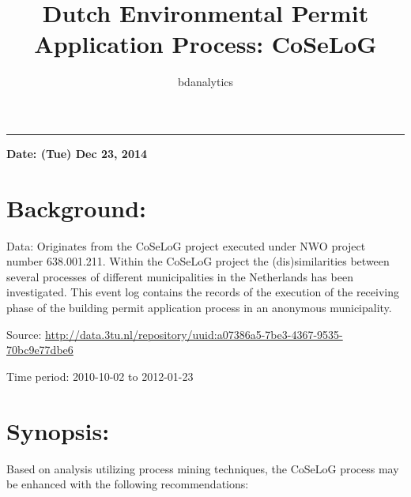 \documentclass[]{article}
\title{Dutch Environmental Permit Application Process: CoSeLoG}
\author{bdanalytics}
\date{}
\begin{document}
\maketitle


{
\hypersetup{linkcolor=black}
\setcounter{tocdepth}{2}
\tableofcontents
}
\begin{center}\rule{0.5\linewidth}{\linethickness}\end{center}

\textbf{Date: (Tue) Dec 23, 2014}

\section{Background:}\label{background}

Data: Originates from the CoSeLoG project executed under NWO project
number 638.001.211. Within the CoSeLoG project the (dis)similarities
between several processes of different municipalities in the Netherlands
has been investigated. This event log contains the records of the
execution of the receiving phase of the building permit application
process in an anonymous municipality.

Source:
\url{http://data.3tu.nl/repository/uuid:a07386a5-7be3-4367-9535-70bc9e77dbe6}

Time period: 2010-10-02 to 2012-01-23

\section{Synopsis:}\label{synopsis}

Based on analysis utilizing process mining techniques, the CoSeLoG
process may be enhanced with the following recommendations:
\end{document}
